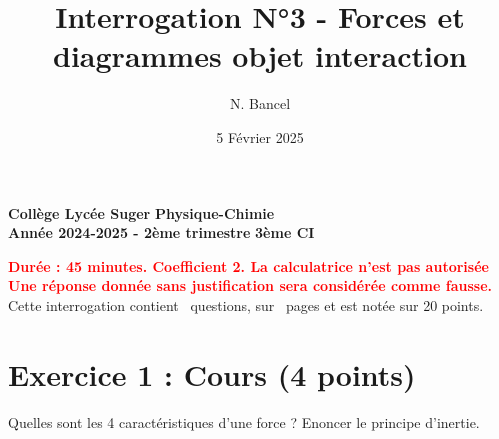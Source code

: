 \documentclass[answers]{exam}
\title{Interrogation N°3 - Forces et diagrammes objet interaction}
\author{N. Bancel}
\date{5 Février 2025}
\begin{document}
\textbf{Collège Lycée Suger}
\hfill
\textbf{Physique-Chimie} \\

\textbf{Année 2024-2025 - 2ème trimestre}
\hfill
\textbf{3ème CI} \par

{\let\newpage\relax\maketitle}

\begin{center}
\textbf{\textcolor{red}{Durée : 45 minutes. Coefficient 2. La calculatrice n'est pas autorisée}} \\
\textbf{\textcolor{red}{Une réponse donnée sans justification sera considérée comme fausse.}} \\
Cette interrogation contient \numquestions\ questions, sur \numpages\ pages et est notée sur 20 points. 

\end{center}

\section*{Exercice 1 : Cours (4 points)}

\vspace{1em}

\begin{questions}
  \question[2] Quelles sont les 4 caractéristiques d'une force ?
  \question[2] Enoncer le principe d'inertie.
\end{questions}
\end{document}
